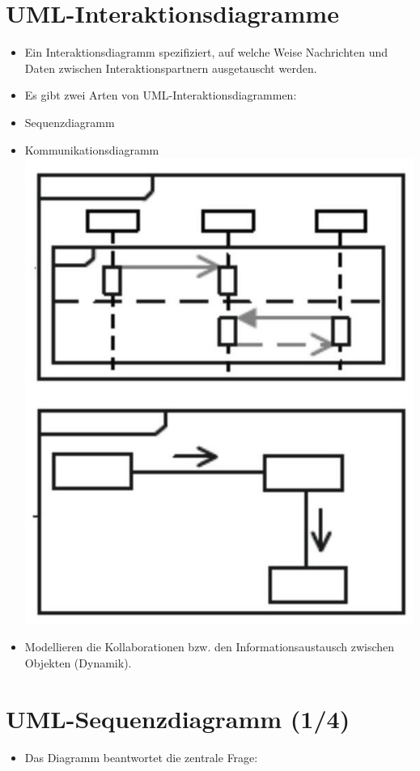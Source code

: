 \documentclass[10pt]{article}
\begin{document}
\section*{UML-Interaktionsdiagramme}
\begin{itemize}
  \item Ein Interaktionsdiagramm spezifiziert, auf welche Weise Nachrichten und Daten zwischen Interaktionspartnern ausgetauscht werden.
  \item Es gibt zwei Arten von UML-Interaktionsdiagrammen:
  \item Sequenzdiagramm
  \item Kommunikationsdiagramm\\
\includegraphics[max width=\textwidth, center]{2025_01_02_787afb9584031d2940deg-14}
  \item Modellieren die Kollaborationen bzw. den Informationsaustausch zwischen Objekten (Dynamik).
\end{itemize}

\section*{UML-Sequenzdiagramm (1/4)}
\begin{itemize}
  \item Das Diagramm beantwortet die zentrale Frage:
\end{itemize}
\end{document}
